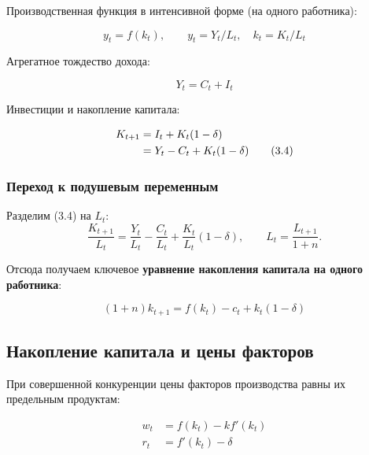 \documentclass[10pt,a4paper]{article}
\begin{document}
Производственная функция в интенсивной форме (на одного работника):
\begin{formulabox}
\begin{equation}
y_t = f(k_t), \qquad y_t = Y_t/L_t,\quad k_t = K_t/L_t \tag{3.2}
\end{equation}
\end{formulabox}

Агрегатное тождество дохода:
\begin{formulabox}
\begin{equation}
Y_t = C_t + I_t \tag{3.3}
\end{equation}
\end{formulabox}

Инвестиции и накопление капитала:
\begin{formulabox}
\begin{align}
K_{t+1} &= I_t + K_t(1-\delta) \notag\\
&= Y_t - C_t + K_t(1-\delta) \tag{3.4}
\end{align}
\end{formulabox}

\subsubsection{Переход к подушевым переменным}

Разделим (3.4) на $L_t$:
$$\frac{K_{t+1}}{L_t} = \frac{Y_t}{L_t} - \frac{C_t}{L_t} + \frac{K_t}{L_t}(1-\delta), \qquad L_t = \frac{L_{t+1}}{1+n}.$$

Отсюда получаем ключевое \textbf{уравнение накопления капитала на одного работника}:
\begin{formulabox}
\begin{equation}
(1+n)k_{t+1} = f(k_t) - c_t + k_t(1-\delta) \tag{3.5}
\end{equation}
\end{formulabox}

\subsection{Накопление капитала и цены факторов}

При совершенной конкуренции цены факторов производства равны их предельным продуктам:
\begin{formulabox}
\begin{align}
w_t &= f(k_t) - k f'(k_t) \tag{3.6}\\
r_t &= f'(k_t) - \delta \tag{3.7}
\end{align}
\end{formulabox}
\end{document}
